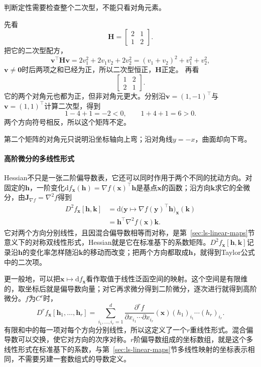 判断定性需要检查整个二次型，不能只看对角元素。
\begin{example}[用二次型判断Hessian的定性]
\label{ex:multivariable-hessian-definiteness}
先看
\[
 \bm H=\begin{bmatrix}2&1\\1&2\end{bmatrix}.
\]
把它的二次型配方，
\[
 \bm v^\top\bm H\bm v=2v_1^2+2v_1v_2+2v_2^2=(v_1+v_2)^2+v_1^2+v_2^2,
\]
$\bm v\neq\bm0$时后两项之和已经为正，所以二次型恒正，$\bm H$正定。
再看
\[
 \begin{bmatrix}1&2\\2&1\end{bmatrix}.
\]
它的两个对角元也都为正，但非对角元更大。分别沿$\bm v=(1,-1)^\top$与$\bm v=(1,1)^\top$计算二次型，得到
\[
 1-4+1=-2<0,\qquad 1+4+1=6>0.
\]
两个方向符号相反，所以这个矩阵不定。
\end{example}

第二个矩阵的对角元只说明沿坐标轴向上弯；沿对角线$y=-x$，曲面却向下弯。

\paragraph{高阶微分的多线性形式}

Hessian不只是一张二阶偏导数表，它还可以同时作用于两个不同的扰动方向。对固定的$\bm h$，一阶变化$\mathrm df_{\bm x}(\bm h)=\nabla f(\bm x)^\top\bm h$是基点$\bm x$的函数；沿方向$\bm k$求它的全微分，由$\bm J_{\nabla f}=\nabla^2f$得到
\[
 \begin{aligned}
 D^2f_{\bm x}[\bm h,\bm k]
 &=\mathrm d\bigl(\bm y\mapsto\nabla f(\bm y)^\top\bm h\bigr)_{\bm x}(\bm k)\\
 &=\bm h^\top\nabla^2f(\bm x)\bm k .
 \end{aligned}
\]
它对两个方向分别线性，且因混合偏导数相等而对称，是第~\ref{sec:ls-linear-maps}节意义下的对称双线性形式，Hessian就是它在标准基下的系数矩阵。$D^2f_{\bm x}[\bm h,\bm k]$记录沿$\bm h$的变化率怎样随沿$\bm k$的移动而改变；把两个方向都取成$\bm h$，就得到Taylor公式中的二次项。

更一般地，可以把$\bm x\mapsto\mathrm df_{\bm x}$看作取值于线性泛函空间的映射。这个空间是有限维的，取坐标后就是偏导数向量；对它再求微分得到二阶微分，逐次进行就得到高阶微分。$f$为$C^r$时，
\[
 D^rf_{\bm x}[\bm h_1,\ldots,\bm h_r]
 =\sum_{i_1,\ldots,i_r=1}^d
 \frac{\partial^rf}{\partial x_{i_1}\cdots\partial x_{i_r}}(\bm x)
 (h_1)_{i_1}\cdots(h_r)_{i_r}.
\]
有限和中的每一项对每个方向分别线性，所以这定义了一个$r$重线性形式。混合偏导数可以交换，使它对方向的次序对称。$r$阶偏导数组成的坐标数组，就是这个多线性形式在标准基下的系数，与第~\ref{sec:ls-linear-maps}节多线性映射的坐标表示相同，不需要另建一套数组式的导数定义。

